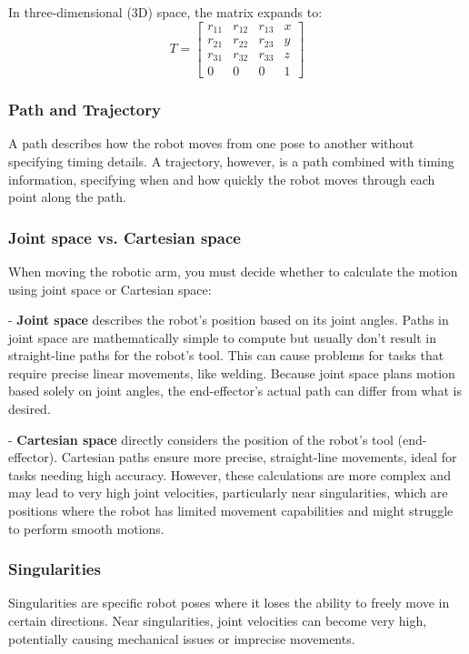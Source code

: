 \documentclass[a4paper,12pt]{article}
\begin{document}
In three-dimensional (3D) space, the matrix expands to:
\[
T = 
\begin{bmatrix}
r_{11} & r_{12} & r_{13} & x \\
r_{21} & r_{22} & r_{23} & y \\
r_{31} & r_{32} & r_{33} & z \\
0 & 0 & 0 & 1
\end{bmatrix}
\]

\subsubsection{Path and Trajectory}
A path describes how the robot moves from one pose to another without specifying timing details. A trajectory, however, is a path combined with timing information, specifying when and how quickly the robot moves through each point along the path.

\subsubsection{Joint space vs. Cartesian space}
When moving the robotic arm, you must decide whether to calculate the motion using joint space or Cartesian space:

- \textbf{Joint space} describes the robot's position based on its joint angles. Paths in joint space are mathematically simple to compute but usually don't result in straight-line paths for the robot's tool. This can cause problems for tasks that require precise linear movements, like welding. Because joint space plans motion based solely on joint angles, the end-effector's actual path can differ from what is desired.

- \textbf{Cartesian space} directly considers the position of the robot's tool (end-effector). Cartesian paths ensure more precise, straight-line movements, ideal for tasks needing high accuracy. However, these calculations are more complex and may lead to very high joint velocities, particularly near singularities, which are positions where the robot has limited movement capabilities and might struggle to perform smooth motions.

\subsubsection{Singularities}
Singularities are specific robot poses where it loses the ability to freely move in certain directions. Near singularities, joint velocities can become very high, potentially causing mechanical issues or imprecise movements.
\end{document}
